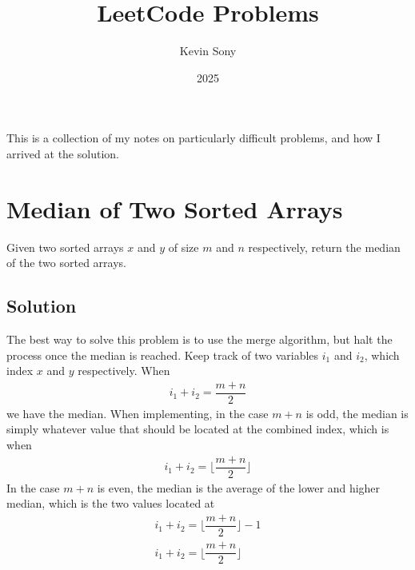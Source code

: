\documentclass{article}
\title{LeetCode Problems}
\author{Kevin Sony}
\date{2025}
\newcommand{\floor}[1]{\lfloor #1 \rfloor}
\begin{document}
\maketitle

This is a collection of my notes on particularly difficult problems, and how I arrived at the solution.

\section*{Median of Two Sorted Arrays}

Given two sorted arrays $x$ and $y$ of size $m$ and $n$ respectively, return the median of the two sorted arrays.

\subsection*{Solution}

The best way to solve this problem is to use the merge algorithm, but halt the process once the median is reached. Keep track of two variables $i_1$ and $i_2$, which index $x$ and $y$ respectively. When
\begin{gather*}
i_1 + i_2 = \dfrac{m + n}{2}
\end{gather*}
we have the median. When implementing, in the case \( m + n \) is odd, the median is simply whatever value that should be located at the combined index, which is when
\begin{gather*}
i_1 + i_2 = \floor{ \dfrac{m + n}{2} }
\end{gather*}
In the case \( m + n \) is even, the median is the average of the lower and higher median, which is the two values located at
\begin{gather*}
i_1 + i_2 = \floor{ \dfrac{m + n}{2} } - 1\\
i_1 + i_2 = \floor{ \dfrac{m + n}{2} } 
\end{gather*}
\end{document}
